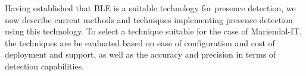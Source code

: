 Having established that BLE is a suitable technology for presence detection, we now describe current methods and techniques implementing presence detection using this technology.
To select a technique suitable for the case of Mariendal-IT, the techniques are be evaluated based on ease of configuration and cost of deployment and support, as well as the accuracy and precision in terms of detection capabilities.

